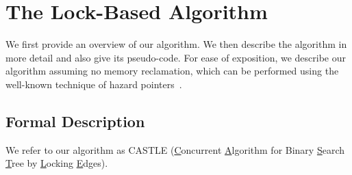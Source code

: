 \newenvironment{limitscope}{}{}
\begin{limitscope}
\newcommand{\accesspath}{access-path}
\newcommand{\terminalnode}{terminal node}

\newcommand{\true}{\textsf{true}}
\newcommand{\false}{\textsf{false}}

\newcommand{\CAS}{\textsf{CAS}}

\newcommand{\sNodeOne}{\mathbb{R}}
\newcommand{\sNodeTwo}{\mathbb{S}}
\newcommand{\sKeyOne}{\infty_1}
\newcommand{\sKeyTwo}{\infty_2}

\newcommand{\targetnode}{target node}
\newcommand{\anchornode}{anchor node}

\newcommand{\myparent}{parent}
\newcommand{\myleft}{le\!f\!t}
\newcommand{\myright}{right}

\newcommand{\CASTLE}{\textsc{CASTLE}}
\newcommand{\CITRUS}{\textsc{CITRUS}}
\newcommand{\HJBST}{\textsc{LF-IBST}}
\newcommand{\NMBST}{\textsc{LF-EBST}}

\newcommand{\RemoveChild}{\textsc{RemoveChild}}
\newcommand{\LockAll}{\textsc{LockAll}}
\newcommand{\UnlockAll}{\textsc{UnlockAll}}
\newcommand{\ClearFlags}{\textsc{ClearFlags}}
\newcommand{\FindSmallest}{\textsc{FindSmallest}}

\newcommand{\lFlag}{lFlag}
\newcommand{\mFlag}{mFlag}
\newcommand{\nFlag}{nFlag}


\section{The Lock-Based Algorithm}
\label{sec:castle-algorithm}
We first provide an overview of our algorithm. We then describe the algorithm in more detail and also give its pseudo-code. For ease of exposition, we describe our algorithm assuming no memory reclamation, which can be performed using the well-known technique of hazard pointers~\cite{Mic:2004:TPDS}.





\subsection{Formal Description}

We refer to our algorithm as \CASTLE{} (\underline{C}oncurrent \underline{A}lgorithm for Binary \underline{S}earch \underline{T}ree by \underline{L}ocking \underline{E}dges). 


\end{limitscope}
